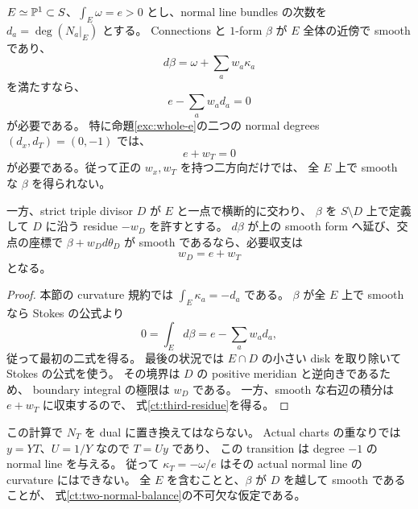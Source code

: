 \begin{proposition}
\label{ct:degree-residue}
$E\simeq\mathbb P^1\subset S$、$\int_E\omega=e>0$ とし、normal line bundles の次数を
$d_a=\deg(N_a|_E)$ とする。
Connections と $1$-form $\beta$ が $E$ 全体の近傍で smooth であり、
\[
 d\beta=\omega+\sum_a w_a\kappa_a
\]
を満たすなら、
\begin{equation}\label{ct:degree-balance}
 e-\sum_a w_ad_a=0
\end{equation}
が必要である。
特に命題\ref{exc:whole-e}の二つの normal degrees $(d_x,d_T)=(0,-1)$ では、
\begin{equation}\label{ct:two-normal-balance}
 e+w_T=0
\end{equation}
が必要である。従って正の $w_x,w_T$ を持つ二方向だけでは、
全 $E$ 上で smooth な $\beta$ を得られない。

一方、strict triple divisor $D$ が $E$ と一点で横断的に交わり、
$\beta$ を $S\setminus D$ 上で定義して $D$ に沿う residue $-w_D$ を許すとする。
$d\beta$ が上の smooth form へ延び、交点の座標で
$\beta+w_Dd\theta_D$ が smooth であるなら、必要収支は
\begin{equation}\label{ct:third-residue}
 w_D=e+w_T
\end{equation}
となる。
\end{proposition}

\begin{proof}
本節の curvature 規約では $\int_E\kappa_a=-d_a$ である。
$\beta$ が全 $E$ 上で smooth なら Stokes の公式より
\[
 0=\int_Ed\beta=e-\sum_aw_ad_a,
\]
従って最初の二式を得る。
最後の状況では $E\cap D$ の小さい disk を取り除いて Stokes の公式を使う。
その境界は $D$ の positive meridian と逆向きであるため、
boundary integral の極限は $w_D$ である。
一方、smooth な右辺の積分は $e+w_T$ に収束するので、
式\eqref{ct:third-residue}を得る。
\end{proof}

この計算で $N_T$ を dual に置き換えてはならない。
Actual charts の重なりでは $y=YT$、$U=1/Y$ なので $T=Uy$ であり、
この transition は degree $-1$ の normal line を与える。
従って $\kappa_T=-\omega/e$ はその actual normal line の curvature にはできない。
全 $E$ を含むことと、$\beta$ が $D$ を越して smooth であることが、
式\eqref{ct:two-normal-balance}の不可欠な仮定である。

